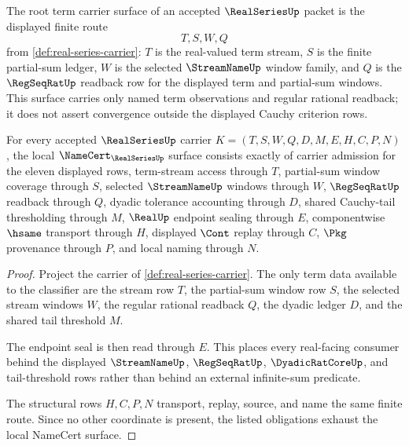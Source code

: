 \begin{definition}
\label{def:realseries-term-carrier-surface}
The root term carrier surface of an accepted $\RealSeriesUp$ packet is the displayed finite route
$$
T,S,W,Q
$$
from \autoref{def:real-series-carrier}: $T$ is the real-valued term stream, $S$ is the finite partial-sum ledger, $W$ is the selected $\StreamNameUp$ window family, and $Q$ is the $\RegSeqRatUp$ readback row for the displayed term and partial-sum windows. This surface carries only named term observations and regular rational readback; it does not assert convergence outside the displayed Cauchy criterion rows.
\end{definition}

\begin{theorem}\label{thm:real-series-namecert-obligations}
For every accepted $\RealSeriesUp$ carrier $K=(T,S,W,Q,D,M,E,H,C,P,N)$, the local $\NameCert_{\RealSeriesUp}$ surface consists exactly of carrier admission for the eleven displayed rows, term-stream access through $T$, partial-sum window coverage through $S$, selected $\StreamNameUp$ windows through $W$, $\RegSeqRatUp$ readback through $Q$, dyadic tolerance accounting through $D$, shared Cauchy-tail thresholding through $M$, $\RealUp$ endpoint sealing through $E$, componentwise $\hsame$ transport through $H$, displayed $\Cont$ replay through $C$, $\Pkg$ provenance through $P$, and local naming through $N$.
\end{theorem}
\begin{proof}
Project the carrier of \autoref{def:real-series-carrier}. The only term data available to the classifier are the stream row $T$, the partial-sum window row $S$, the selected stream windows $W$, the regular rational readback $Q$, the dyadic ledger $D$, and the shared tail threshold $M$.

The endpoint seal is then read through $E$. This places every real-facing consumer behind the displayed $\StreamNameUp$, $\RegSeqRatUp$, $\DyadicRatCoreUp$, and tail-threshold rows rather than behind an external infinite-sum predicate.

The structural rows $H,C,P,N$ transport, replay, source, and name the same finite route. Since no other coordinate is present, the listed obligations exhaust the local NameCert surface.
\end{proof}

